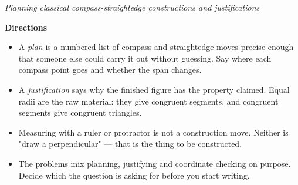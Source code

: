 \documentclass[12pt]{article}
\begin{document}

\begin{center}
{\small\textit{Planning classical compass-straightedge constructions and justifications}}
\end{center}

\vspace{0.15cm}
\noindent\textbf{Directions}
\begin{itemize}[leftmargin=0.7cm, itemsep=1pt, topsep=3pt]
  \item A \emph{plan} is a numbered list of compass and straightedge moves precise
    enough that someone else could carry it out without guessing. Say where each
    compass point goes and whether the span changes.
  \item A \emph{justification} says why the finished figure has the property
    claimed. Equal radii are the raw material: they give congruent segments, and
    congruent segments give congruent triangles.
  \item Measuring with a ruler or protractor is not a construction move. Neither
    is "draw a perpendicular" --- that is the thing to be constructed.
  \item The problems mix planning, justifying and coordinate checking on purpose.
    Decide which the question is asking for before you start writing.
\end{itemize}

\vspace{0.2cm}


\end{document}
